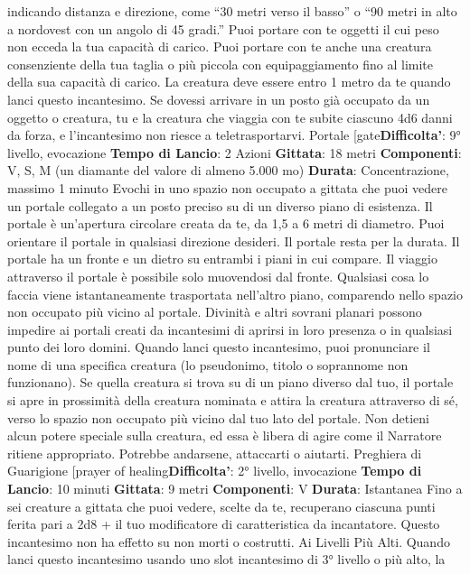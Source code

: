 \begin{multicols}{2}
indicando distanza e direzione, come “30 metri verso il
basso” o “90 metri in alto a nordovest con un angolo di
45 gradi.”
Puoi portare con te oggetti il cui peso non ecceda la tua
capacità di carico. Puoi portare con te anche una
creatura consenziente della tua taglia o più piccola con
equipaggiamento fino al limite della sua capacità di
carico. La creatura deve essere entro 1 metro da te
quando lanci questo incantesimo.
Se dovessi arrivare in un posto già occupato da un
oggetto o creatura, tu e la creatura che viaggia con te
subite ciascuno 4d6 danni da forza, e l’incantesimo non
riesce a teletrasportarvi.
Portale
[gate\textbf{Difficolta'}:
9° livello, evocazione
\textbf{Tempo di Lancio}: 2 Azioni
\textbf{Gittata}: 18 metri
\textbf{Componenti}: V, S, M (un diamante del valore di
almeno 5.000 mo)
\textbf{Durata}: Concentrazione, massimo 1 minuto
Evochi in uno spazio non occupato a gittata che puoi
vedere un portale collegato a un posto preciso su di un
diverso piano di esistenza. Il portale è un’apertura
circolare creata da te, da 1,5 a 6 metri di diametro. Puoi
orientare il portale in qualsiasi direzione desideri. Il
portale resta per la durata.
Il portale ha un fronte e un dietro su entrambi i piani in
cui compare. Il viaggio attraverso il portale è possibile
solo muovendosi dal fronte. Qualsiasi cosa lo faccia
viene istantaneamente trasportata nell’altro piano,
comparendo nello spazio non occupato più vicino al
portale.
Divinità e altri sovrani planari possono impedire ai
portali creati da incantesimi di aprirsi in loro presenza o
in qualsiasi punto dei loro domini.
Quando lanci questo incantesimo, puoi pronunciare il
nome di una specifica creatura (lo pseudonimo, titolo o
soprannome non funzionano). Se quella creatura si
trova su di un piano diverso dal tuo, il portale si apre in
prossimità della creatura nominata e attira la creatura
attraverso di sé, verso lo spazio non occupato più vicino
dal tuo lato del portale. Non detieni alcun potere
speciale sulla creatura, ed essa è libera di agire come il
Narratore ritiene appropriato. Potrebbe andarsene, attaccarti
o aiutarti.
Preghiera di Guarigione
[prayer of healing\textbf{Difficolta'}:
2° livello, invocazione
\textbf{Tempo di Lancio}: 10 minuti
\textbf{Gittata}: 9 metri
\textbf{Componenti}: V
\textbf{Durata}: Istantanea
Fino a sei creature a gittata che puoi vedere, scelte da
te, recuperano ciascuna punti ferita pari a 2d8 + il tuo
modificatore di caratteristica da incantatore. Questo
incantesimo non ha effetto su non morti o costrutti.
Ai Livelli Più Alti. Quando lanci questo incantesimo
usando uno slot incantesimo di 3° livello o più alto, la

\end{multicols}
